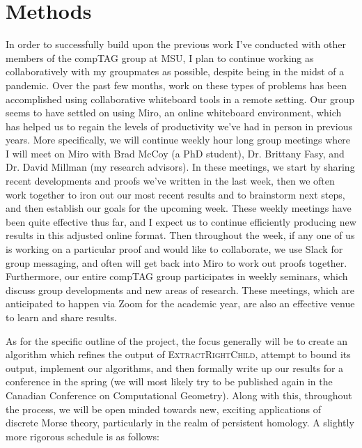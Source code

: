 \documentclass[11pt]{article}
\begin{document}
\section{Methods}
In order to successfully build upon the previous work I've conducted with other members
of the compTAG group at MSU, I plan to continue working as collaboratively with my
groupmates as possible, despite being in the midst of a pandemic. Over the past few months,
work on these types of problems has been accomplished using collaborative
whiteboard tools in a remote setting. Our group seems to have settled on using Miro,
an online whiteboard environment, which has helped us to regain the levels of productivity
we've had in person in previous years. More specifically, we will continue weekly hour long
group meetings where I will meet on Miro with Brad McCoy (a PhD student), Dr. Brittany Fasy,
and Dr. David Millman (my research advisors). In these meetings, we start by sharing recent 
developments and proofs we've written in the last week, then we often work together to iron out
our most recent results and to brainstorm next steps, and then establish our goals for the
upcoming week. These weekly meetings have been quite effective thus far, and I expect us to
continue efficiently producing new results in this adjusted online format. Then throughout the
week, if any one of us is working on a particular proof and would like to collaborate, we use
Slack for group messaging, and often will get back into Miro to work out proofs together.
Furthermore, our entire compTAG group participates in weekly seminars, which discuss group
developments and new areas of research. These meetings, which are anticipated to happen via
Zoom for the academic year, are also an effective venue to learn and share results.

As for the specific outline of the project, the focus generally will be to create an algorithm
which refines the output of \textsc{ExtractRightChild}, attempt to bound its output, implement our algorithms,
and then formally write up our results for a conference in the spring (we will most likely try to be published 
again in the Canadian Conference on Computational Geometry). Along with this, throughout the process,
we will be open minded towards new, exciting applications of discrete Morse theory, particularly in the
realm of persistent homology. A slightly more rigorous schedule is as follows:
\end{document}
